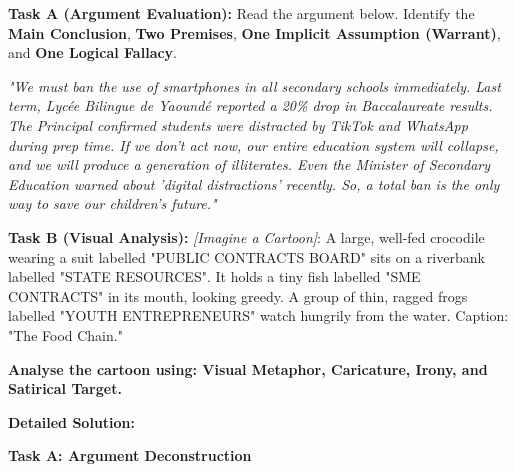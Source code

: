 \documentclass[11pt]{article}
\begin{document}
\begin{exoresolu}
\textbf{Task A (Argument Evaluation):} Read the argument below. Identify the \textbf{Main Conclusion}, \textbf{Two Premises}, \textbf{One Implicit Assumption (Warrant)}, and \textbf{One Logical Fallacy}.

\textit{"We must ban the use of smartphones in all secondary schools immediately. Last term, Lycée Bilingue de Yaoundé reported a 20\% drop in Baccalaureate results. The Principal confirmed students were distracted by TikTok and WhatsApp during prep time. If we don't act now, our entire education system will collapse, and we will produce a generation of illiterates. Even the Minister of Secondary Education warned about 'digital distractions' recently. So, a total ban is the only way to save our children's future."}

\textbf{Task B (Visual Analysis):} \textit{[Imagine a Cartoon]}: A large, well-fed crocodile wearing a suit labelled "PUBLIC CONTRACTS BOARD" sits on a riverbank labelled "STATE RESOURCES". It holds a tiny fish labelled "SME CONTRACTS" in its mouth, looking greedy. A group of thin, ragged frogs labelled "YOUTH ENTREPRENEURS" watch hungrily from the water. Caption: "The Food Chain."

\textbf{Analyse the cartoon using: Visual Metaphor, Caricature, Irony, and Satirical Target.}

\tcblower
\textbf{Detailed Solution:}

\textbf{Task A: Argument Deconstruction}


\end{exoresolu}
\end{document}
